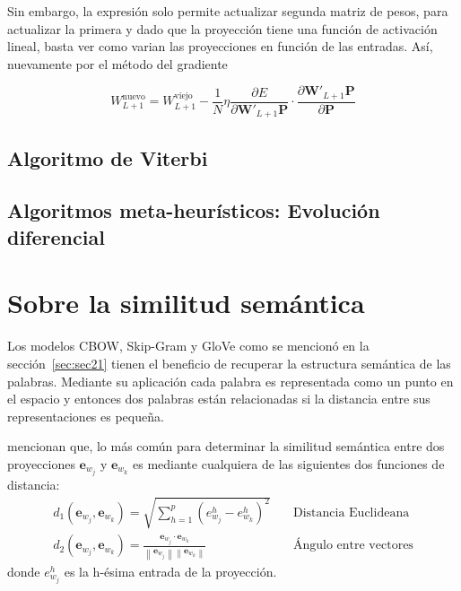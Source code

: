 Sin embargo, la expresión solo permite actualizar segunda matriz de pesos, para actualizar la primera y dado que la proyección tiene una función de activación lineal, basta ver como varian las proyecciones en función de las entradas. Así, nuevamente por el método del gradiente

\begin{equation}
	W_{L+1}^{\mbox{nuevo}} = W_{L+1}^{\mbox{viejo}} - \frac{1}{N}\eta\frac{\partial E}{\partial \mathbf{W}'_{L+1}\mathbf{P}} \cdot \frac{\partial \mathbf{W}'_{L+1}\mathbf{P}}{\partial \mathbf{P}}
\end{equation}


\subsection{Algoritmo de Viterbi}

\subsection{Algoritmos meta-heurísticos: Evolución diferencial}

\section{Sobre la similitud semántica}
\label{sec:sec25}

Los modelos CBOW, Skip-Gram y GloVe como se mencionó en la sección~\ref{sec:sec21} tienen el beneficio de recuperar la estructura semántica de las palabras. Mediante su aplicación cada palabra es representada como un punto en el espacio y entonces dos palabras están relacionadas si la distancia entre sus representaciones es pequeña. 

\cite{bellegarda2016state} mencionan que, lo más común para determinar la similitud semántica entre dos proyecciones $\mathbf{e}_{w_j}$ y $\mathbf{e}_{w_k}$ es mediante cualquiera de las siguientes dos funciones de distancia:
\begin{align*}
	d_1\left(\mathbf{e}_{w_j},\mathbf{e}_{w_k}\right) = \sqrt{\sum_{h=1}^p \left(e_{w_j}^h -e_{w_k}^h\right)^2} & \quad \mbox{Distancia Euclideana}\\
	d_2\left(\mathbf{e}_{w_j},\mathbf{e}_{w_k}\right) = \frac{\mathbf{e}_{w_j}\cdot \mathbf{e}_{w_k}}{\left\lVert\mathbf{e}_{w_j}\right\rVert\left\lVert\mathbf{e}_{w_k}\right\rVert} & \quad \mbox{Ángulo entre vectores}
\end{align*}
donde $e_{w_j}^h$ es la h-ésima entrada de la proyección.


